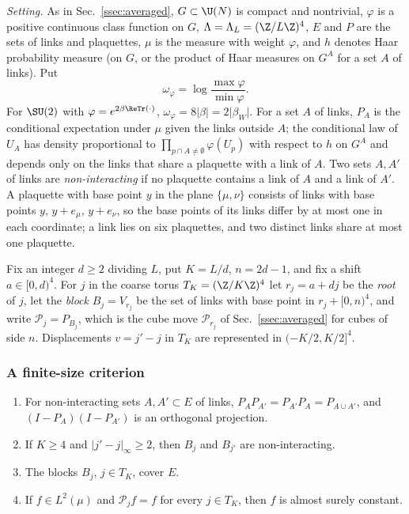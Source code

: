 \emph{Setting.} As in Sec.~\ref{ssec:averaged}, $G\subset\U(N)$ is compact
and nontrivial, $\varphi$ is a positive continuous class function on $G$,
$\Lambda=\Lambda_L=(\Z/L\Z)^4$, $E$ and $P$ are the sets of links and
plaquettes, $\mu$ is the measure with weight $\varphi$, and $h$ denotes
Haar probability measure (on $G$, or the product of Haar measures on $G^A$
for a set $A$ of links). Put
\[
\omega_\varphi=\log\frac{\max\varphi}{\min\varphi}.
\]
For $\SU(2)$ with $\varphi=e^{2\beta\ReTr(\cdot)}$, $\omega_\varphi=8\lvert
\beta\rvert=2\lvert\beta_W\rvert$. For a set $A$ of links, $P_A$ is the
conditional expectation under $\mu$ given the links outside $A$; the
conditional law of $U_A$ has density proportional to $\prod_{p\cap A\ne
\emptyset}\varphi(U_p)$ with respect to $h$ on $G^A$ and depends only on the
links that share a plaquette with a link of $A$. Two sets $A,A'$ of links
are \emph{non-interacting} if no plaquette contains a link of $A$ and a link
of $A'$. A plaquette with base point $y$ in the plane $\{\mu,\nu\}$ consists
of links with base points $y$, $y+e_\mu$, $y+e_\nu$, so the base points of
its links differ by at most one in each coordinate; a link lies on six
plaquettes, and two distinct links share at most one plaquette.

Fix an integer $d\ge2$ dividing $L$, put $K=L/d$, $n=2d-1$, and fix a shift
$a\in[0,d)^4$. For $j$ in the coarse torus $T_K=(\Z/K\Z)^4$ let $r_j=a+dj$
be the \emph{root} of $j$, let the \emph{block} $B_j=V_{r_j}$ be the set of
links with base point in $r_j+[0,n)^4$, and write $\mathcal P_j=P_{B_j}$,
which is the cube move $\mathcal P_{r_j}$ of Sec.~\ref{ssec:averaged} for
cubes of side $n$. Displacements $v=j'-j$ in $T_K$ are represented in
$(-K/2,K/2]^4$.

\subsubsection{A finite-size criterion}

\begin{lemma}\label{rC12:commute}
\begin{enumerate}[label=\textup{(\roman*)},leftmargin=*]
\item For non-interacting sets $A,A'\subset E$ of links, $P_AP_{A'}=
P_{A'}P_A=P_{A\cup A'}$, and $(I-P_A)(I-P_{A'})$ is an orthogonal projection.
\item If $K\ge4$ and $\lvert j'-j\rvert_\infty\ge2$, then $B_j$ and $B_{j'}$
are non-interacting.
\item The blocks $B_j$, $j\in T_K$, cover $E$.
\item If $f\in L^2(\mu)$ and $\mathcal P_jf=f$ for every $j\in T_K$, then $f$
is almost surely constant.
\end{enumerate}
\end{lemma}

